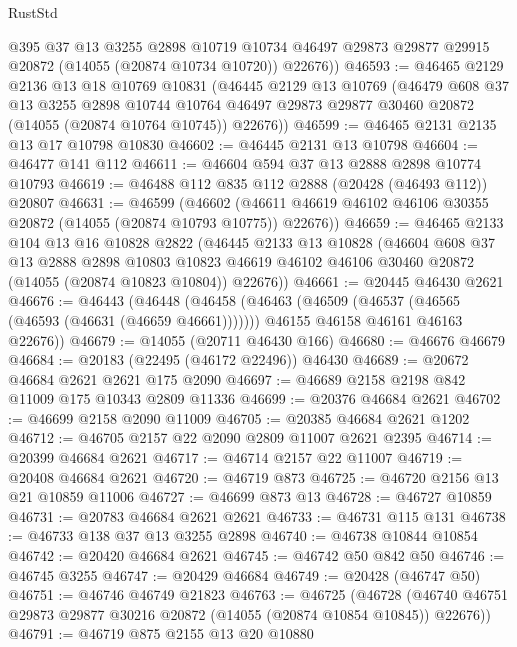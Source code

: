 \begin{lexlean}{RustStd}
\begin{coremodule}
        @395
        @37
        @13
        @3255
        @2898
        @10719
        @10734
        @46497
        @29873
        @29877
        @29915
        @20872
        (@14055 (@20874 @10734 @10720))
        @22676))
@46593 := @46465
    @2129
    @2136
    @13
    @18
    @10769
    @10831
    (@46445
      @2129
      @13
      @10769
      (@46479
        @608
        @37
        @13
        @3255
        @2898
        @10744
        @10764
        @46497
        @29873
        @29877
        @30460
        @20872
        (@14055 (@20874 @10764 @10745))
        @22676))
@46599 := @46465 @2131 @2135 @13 @17 @10798 @10830
@46602 := @46445 @2131 @13 @10798
@46604 := @46477 @141 @112
@46611 := @46604 @594 @37 @13 @2888 @2898 @10774 @10793
@46619 := @46488 @112 @835 @112 @2888 (@20428 (@46493 @112)) @20807
@46631 := @46599
    (@46602 (@46611 @46619 @46102 @46106 @30355 @20872 (@14055 (@20874 @10793 @10775)) @22676))
@46659 := @46465
    @2133
    @104
    @13
    @16
    @10828
    @2822
    (@46445
      @2133
      @13
      @10828
      (@46604
        @608
        @37
        @13
        @2888
        @2898
        @10803
        @10823
        @46619
        @46102
        @46106
        @30460
        @20872
        (@14055 (@20874 @10823 @10804))
        @22676))
@46661 := @20445 @46430 @2621
@46676 := @46443
    (@46448
      (@46458
        (@46463 (@46509 (@46537 (@46565 (@46593 (@46631 (@46659 @46661)))))))
        @46155
        @46158
        @46161
        @46163
        @22676))
@46679 := @14055 (@20711 @46430 @166)
@46680 := @46676 @46679
@46684 := @20183 (@22495 (@46172 @22496)) @46430
@46689 := @20672 @46684 @2621 @2621 @175 @2090
@46697 := @46689 @2158 @2198 @842 @11009 @175 @10343 @2809 @11336
@46699 := @20376 @46684 @2621
@46702 := @46699 @2158 @2090 @11009
@46705 := @20385 @46684 @2621 @1202
@46712 := @46705 @2157 @22 @2090 @2809 @11007 @2621 @2395
@46714 := @20399 @46684 @2621
@46717 := @46714 @2157 @22 @11007
@46719 := @20408 @46684 @2621
@46720 := @46719 @873
@46725 := @46720 @2156 @13 @21 @10859 @11006
@46727 := @46699 @873 @13
@46728 := @46727 @10859
@46731 := @20783 @46684 @2621 @2621
@46733 := @46731 @115 @131
@46738 := @46733 @138 @37 @13 @3255 @2898
@46740 := @46738 @10844 @10854
@46742 := @20420 @46684 @2621
@46745 := @46742 @50 @842 @50
@46746 := @46745 @3255
@46747 := @20429 @46684
@46749 := @20428 (@46747 @50)
@46751 := @46746 @46749 @21823
@46763 := @46725
    (@46728 (@46740 @46751 @29873 @29877 @30216 @20872 (@14055 (@20874 @10854 @10845)) @22676))
@46791 := @46719
    @875
    @2155
    @13
    @20
    @10880

\end{coremodule}
\end{lexlean}
